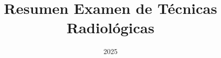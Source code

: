 \documentclass[12pt]{report}
\begin{document}
\title{Resumen Examen de Técnicas Radiológicas}

\date{2025}

\maketitle
\tableofcontents




\end{document}
